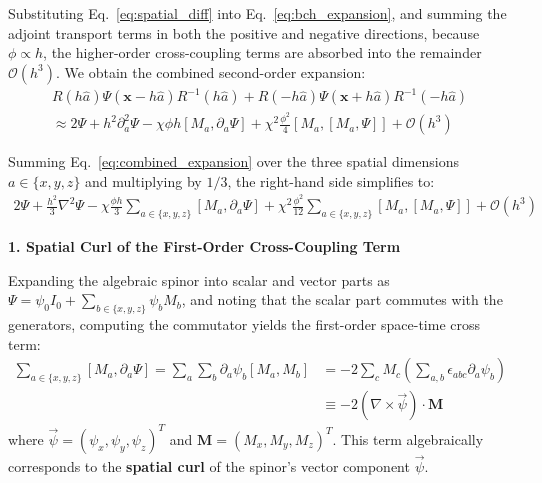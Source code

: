 \documentclass[12pt, a4paper]{article}
\begin{document}
Substituting Eq.~\eqref{eq:spatial_diff} into Eq.~\eqref{eq:bch_expansion}, and summing the adjoint transport terms in both the positive and negative directions, because $\phi \propto h$, the higher-order cross-coupling terms are absorbed into the remainder $\mathcal{O}(h^3)$. We obtain the combined second-order expansion:
\begin{equation}
\label{eq:combined_expansion}
\begin{split}
R(h \hat{a}) \Psi(\mathbf{x} - h \hat{a}) R^{-1}(h \hat{a}) + R(-h \hat{a}) \Psi(\mathbf{x} + h \hat{a}) R^{-1}(-h \hat{a}) \\
\approx 2\Psi + h^2 \partial_a^2 \Psi - \chi \phi h [M_a, \partial_a \Psi] + \chi^2 \frac{\phi^2}{4} [M_a, [M_a, \Psi]] + \mathcal{O}(h^3)
\end{split}
\end{equation}

Summing Eq.~\eqref{eq:combined_expansion} over the three spatial dimensions $a \in \{x,y,z\}$ and multiplying by $1/3$, the right-hand side simplifies to:
\begin{equation}
\label{eq:sum_spatial_bch_expansion}
\begin{split}
2\Psi + \frac{h^2}{3}\nabla^2\Psi - \chi \frac{\phi h}{3}\sum_{a \in \{x,y,z\}} [M_a, \partial_a \Psi] + \chi^2 \frac{\phi^2}{12}\sum_{a \in \{x,y,z\}} [M_a, [M_a, \Psi]] + \mathcal{O}(h^3)
\end{split}
\end{equation}

\textbf{1. Spatial Curl of the First-Order Cross-Coupling Term}

Expanding the algebraic spinor into scalar and vector parts as $\Psi = \psi_0 I_0 + \sum_{b \in \{x,y,z\}} \psi_b M_b$, and noting that the scalar part commutes with the generators, computing the commutator yields the first-order space-time cross term:
\begin{equation}
\label{eq:spatial_curl}
\begin{split}
\sum_{a \in \{x,y,z\}} [M_a, \partial_a \Psi] = \sum_a \sum_b \partial_a \psi_b [M_a, M_b] &= -2 \sum_c M_c \left( \sum_{a,b} \epsilon_{abc} \partial_a \psi_b \right) \\
&\equiv -2 \left( \nabla \times \vec{\psi} \right) \cdot \mathbf{M}
\end{split}
\end{equation}
where $\vec{\psi} = (\psi_x, \psi_y, \psi_z)^T$ and $\mathbf{M} = (M_x, M_y, M_z)^T$. This term algebraically corresponds to the \textbf{spatial curl} of the spinor's vector component $\vec{\psi}$.
\end{document}
